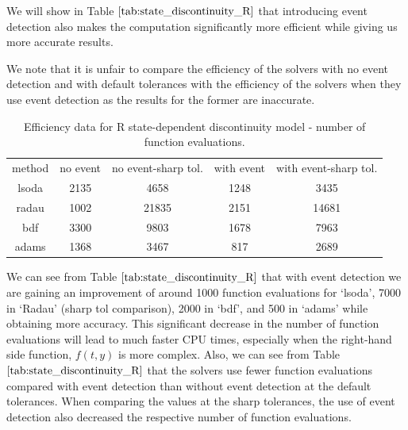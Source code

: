 We will show in Table $\ref{tab:state_discontinuity_R}$ that introducing event detection also makes the computation significantly more efficient while giving us more accurate results.

We note that it is unfair to compare the efficiency of the solvers with no event detection and with default tolerances with the efficiency of the solvers when they use event detection as the results for the former are inaccurate.

\begin{table}[h]
\caption {Efficiency data for R state-dependent discontinuity model - number of function evaluations.} 
\label{tab:state_discontinuity_R}
\begin{center}
\begin{tabular}{ c c c c c } 
method & no event & no event-sharp tol. & with event & with event-sharp tol.\\ 
lsoda & 2135 & 4658 & 1248 & 3435 \\
radau & 1002 & 21835 & 2151 & 14681\\
bdf & 3300 & 9803 & 1678 & 7963\\
adams & 1368 & 3467 & 817 & 2689\\
\end{tabular}
\end{center}
\end{table}

We can see from Table $\ref{tab:state_discontinuity_R}$ that with event detection we are gaining an improvement of around 1000 function evaluations for `lsoda', 7000 in `Radau' (sharp tol comparison), 2000 in `bdf', and 500 in `adams' while obtaining more accuracy. This significant decrease in the number of function evaluations will lead to much faster CPU times, especially when the right-hand side function, $f(t, y)$ is more complex. Also, we can see from Table $\ref{tab:state_discontinuity_R}$ that the solvers use fewer function evaluations compared with event detection than without event detection at the default tolerances. When comparing the values at the sharp tolerances, the use of event detection also decreased the respective number of function evaluations.

